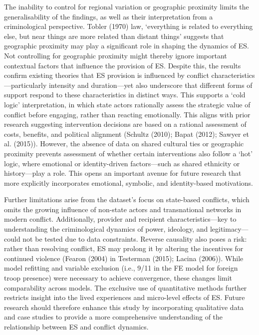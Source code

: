 \documentclass[
]{article}
\begin{document}
The inability to control for regional variation or geographic proximity
limits the generalisability of the findings, as well as their
interpretation from a criminological perspective. Tobler (1970) law,
`everything is related to everything else, but near things are more
related than distant things' suggests that geographic proximity may play
a significant role in shaping the dynamics of ES. Not controlling for
geographic proximity might thereby ignore important contextual factors
that influence the provision of ES. Despite this, the results confirm
existing theories that ES provision is influenced by conflict
characteristics---particularly intensity and duration---yet also
underscore that different forms of support respond to these
characteristics in distinct ways. This supports a `cold logic'
interpretation, in which state actors rationally assess the strategic
value of conflict before engaging, rather than reacting emotionally.
This aligns with prior research suggesting intervention decisions are
based on a rational assessment of costs, benefits, and political
alignment (Schultz (2010); Bapat (2012); Sawyer et al. (2015)). However,
the absence of data on shared cultural ties or geographic proximity
prevents assessment of whether certain interventions also follow a `hot'
logic, where emotional or identity-driven factors---such as shared
ethnicity or history---play a role. This opens an important avenue for
future research that more explicitly incorporates emotional, symbolic,
and identity-based motivations.

Further limitations arise from the dataset's focus on state-based
conflicts, which omits the growing influence of non-state actors and
transnational networks in modern conflict. Additionally, provider and
recipient characteristics---key to understanding the criminological
dynamics of power, ideology, and legitimacy---could not be tested due to
data constraints. Reverse causality also poses a risk: rather than
resolving conflict, ES may prolong it by altering the incentives for
continued violence (Fearon (2004) in Testerman (2015); Lacina (2006)).
While model refitting and variable exclusion (i.e., 9/11 in the FE model
for foreign troop presence) were necessary to achieve convergence, these
changes limit comparability across models. The exclusive use of
quantitative methods further restricts insight into the lived
experiences and micro-level effects of ES. Future research should
therefore enhance this study by incorporating qualitative data and case
studies to provide a more comprehensive understanding of the
relationship between ES and conflict dynamics.
\end{document}
